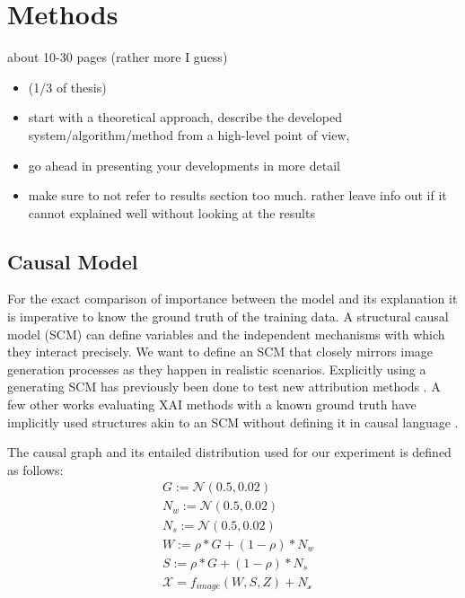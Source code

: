 \chapter{Methods}\label{chapter:method}

{ \color{red}

    about 10-30 pages (rather more I guess)

    \begin{itemize}
        \item (1/3 of thesis)
        \item start with a theoretical approach, describe the developed system/algorithm/method from a high-level point of view,
        \item go ahead in presenting your developments in more detail
        \item make sure to not refer to results section too much. rather leave info out if it cannot explained well without looking at the results
    \end{itemize}
}


\section{Causal Model}
For the exact comparison of importance between the model and its explanation it is imperative to know the ground truth of the training data. A structural causal model (SCM) can define variables and the independent mechanisms with which they interact precisely. We want to define an SCM that closely mirrors image generation processes as they happen in realistic scenarios. 
Explicitly using a generating SCM has previously been done to test new attribution methods \cite{Parafita2019, Wilming2023, Goyal2019, Reimers2019, Reimers2020}. A few other works evaluating XAI methods with a known ground truth have implicitly used structures akin to an SCM without defining it in causal language \cite{Kim2018, Yang2019}. 

The causal graph and its entailed distribution used for our experiment is defined as follows: 
\begin{align*}
    & G := \mathcal{N}(0.5,0.02) \\
    & N_w := \mathcal{N}(0.5,0.02) \\
    & N_s := \mathcal{N}(0.5,0.02) \\
    & W := \rho * G + (1-\rho)* N_w \\
    & S := \rho * G + (1-\rho)* N_s \\
    & \mathcal{X} = f_{image}(W, S, Z) + N_{\mathcal{x}} \\
\end{align*}

